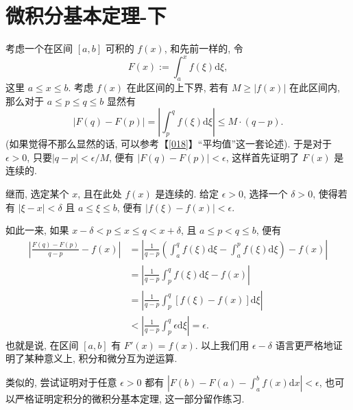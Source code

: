 \section{微积分基本定理-下}\label{019}

\begin{tcolorbox}[size=fbox, breakable, enhanced jigsaw, title={更加严格的版本 - 选读}]

考虑一个在区间 \([a,b]\) 可积的 \(f(x)\), 和先前一样的, 令 \[
F(x):=\int_a^xf(\xi)\mathrm{d}\xi,
\] 这里 \(a\le x \le b\). 考虑 \(f(x)\) 在此区间的上下界, 若有
\(M\ge |f(x)|\) 在此区间内, 那么对于 \(a\le p \le q \le b\) 显然有 \[
|F(q)-F(p)|=\left|\int_p^qf(\xi)\mathrm{d}\xi\right|\le M\cdot(q-p).
\] (如果觉得不那么显然的话, 可以参考【\ref{018}】``平均值''这一套论述).
于是对于 \(\epsilon>0\), 只要\(|q-p|<\epsilon/M\), 便有
\(|F(q)-F(p)|<\epsilon\), 这样首先证明了 \(F(x)\) 是连续的.

继而, 选定某个 \(x\), 且在此处 \(f(x)\) 是连续的. 给定 \(\epsilon>0\),
选择一个 \(\delta>0\), 使得若有 \(|\xi-x|<\delta\) 且 \(a\le\xi\le b\),
便有 \(|f(\xi)-f(x)|<\epsilon\).

如此一来, 如果 \(x-\delta<p\le x\le q<x+\delta\), 且 \(a\le p<q\le b\),
便有 \[
\begin{aligned}
\left|\frac{F(q)-F(p)}{q-p}-f(x)\right|&=\left|\frac{1}{q-p}\left(\int_a^qf(\xi)\mathrm{d}\xi-\int_a^pf(\xi)\mathrm{d}\xi\right)-f(x)\right|\\
&=\left|\frac{1}{q-p}\int_p^qf(\xi)\mathrm{d}\xi-f(x)\right|\\
&=\left|\frac{1}{q-p}\int_p^q[f(\xi)-f(x)]\mathrm{d}\xi\right|\\
&<\left|\frac{1}{q-p}\int_p^q\epsilon\mathrm{d}\xi\right|=\epsilon.
\end{aligned}
\] 也就是说, 在区间 \([a,b]\) 有 \(F'(x)=f(x)\). 以上我们用
\(\epsilon-\delta\) 语言更严格地证明了某种意义上, 积分和微分互为逆运算.

类似的, 尝试证明对于任意 \(\epsilon>0\) 都有
\(\left|F(b)-F(a)-\int_a^bf(x)\mathrm{d}x\right|<\epsilon\),
也可以严格证明定积分的微积分基本定理, 这一部分留作练习.

\end{tcolorbox}


